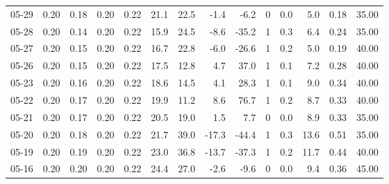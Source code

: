 \begin{threeparttable}
{\begin{tabular}{lrrrrrrrrrrrrr}
  05-29 &          0.20 &          0.18 &          0.20 &        0.22 &                21.1 &                22.5 &       -1.4 &         -6.2 &              0 &                 0.0 &              5.0 &            0.18 &                  35.00 \\
  05-28 &          0.20 &          0.14 &          0.20 &        0.22 &                15.9 &                24.5 &       -8.6 &        -35.2 &              1 &                 0.3 &              6.4 &            0.24 &                  35.00 \\
  05-27 &          0.20 &          0.15 &          0.20 &        0.22 &                16.7 &                22.8 &       -6.0 &        -26.6 &              1 &                 0.2 &              5.0 &            0.19 &                  40.00 \\
  05-26 &          0.20 &          0.15 &          0.20 &        0.22 &                17.5 &                12.8 &        4.7 &         37.0 &              1 &                 0.1 &              7.2 &            0.28 &                  40.00 \\
  05-23 &          0.20 &          0.16 &          0.20 &        0.22 &                18.6 &                14.5 &        4.1 &         28.3 &              1 &                 0.1 &              9.0 &            0.34 &                  40.00 \\
  05-22 &          0.20 &          0.17 &          0.20 &        0.22 &                19.9 &                11.2 &        8.6 &         76.7 &              1 &                 0.2 &              8.7 &            0.33 &                  40.00 \\
  05-21 &          0.20 &          0.17 &          0.20 &        0.22 &                20.5 &                19.0 &        1.5 &          7.7 &              0 &                 0.0 &              8.9 &            0.33 &                  35.00 \\
  05-20 &          0.20 &          0.18 &          0.20 &        0.22 &                21.7 &                39.0 &      -17.3 &        -44.4 &              1 &                 0.3 &             13.6 &            0.51 &                  35.00 \\
  05-19 &          0.20 &          0.19 &          0.20 &        0.22 &                23.0 &                36.8 &      -13.7 &        -37.3 &              1 &                 0.2 &             11.7 &            0.44 &                  40.00 \\
  05-16 &          0.20 &          0.20 &          0.20 &        0.22 &                24.4 &                27.0 &       -2.6 &         -9.6 &              0 &                 0.0 &              9.4 &            0.36 &                  45.00 \\

\end{tabular}}
\end{threeparttable}
